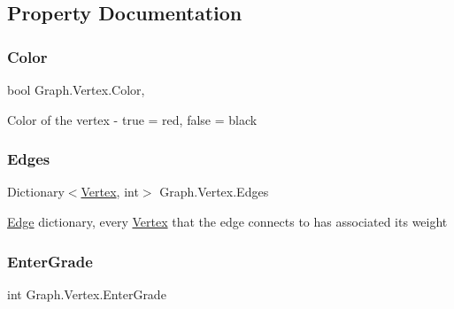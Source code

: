 \subsection{Property Documentation}
\mbox{\label{class_graph_1_1_vertex_a06cc9a5a43a8a9fb1715b19a8877ed01}} 
\subsubsection{\texorpdfstring{Color}{Color}}
{\footnotesize\ttfamily bool Graph.\+Vertex.\+Color\hspace{0.3cm}{\ttfamily [get]}, {\ttfamily [set]}}



Color of the vertex -\/ true = red, false = black 

\mbox{\label{class_graph_1_1_vertex_a494371449797e8a7d9c26d6a49922f42}} 
\subsubsection{\texorpdfstring{Edges}{Edges}}
{\footnotesize\ttfamily Dictionary$<$\hyperlink{class_graph_1_1_vertex}{Vertex}, int$>$ Graph.\+Vertex.\+Edges\hspace{0.3cm}{\ttfamily [get]}}



\hyperlink{class_graph_1_1_edge}{Edge} dictionary, every \hyperlink{class_graph_1_1_vertex}{Vertex} that the edge connects to has associated its weight 

\mbox{\label{class_graph_1_1_vertex_a63c478ac5624dcd7d424212e1b4fa923}} 
\subsubsection{\texorpdfstring{Enter\+Grade}{EnterGrade}}
{\footnotesize\ttfamily int Graph.\+Vertex.\+Enter\+Grade\hspace{0.3cm}{\ttfamily [get]}}



